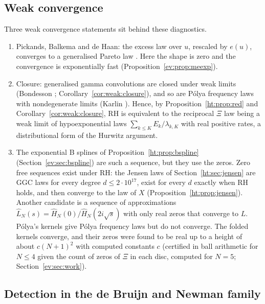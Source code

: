 \subsection{Weak convergence}\label{ev:sec:weak}

Three weak convergence statements sit behind these diagnostics.
\begin{enumerate}
\item Pickands, Balkema and de Haan: the excess law over $u$, rescaled by $e(u)$, converges to a generalised Pareto law \cite{Pickands75,BalkemaDeHaan74}. %
Here the shape is zero and the convergence is exponentially fast (Proposition~\ref{ev:prop:meexp}).
\item Closure: generalised gamma convolutions are closed under weak limits (Bondesson \cite{Bondesson}; Corollary~\ref{cor:weak:closure}), and so are P\'olya frequency laws with nondegenerate limits (Karlin \cite{Karlin68}). %
Hence, by Proposition~\ref{ht:prop:red} and Corollary~\ref{cor:weak:closure}, RH is equivalent to the reciprocal $\Xi$ law being a weak limit of hypoexponential laws $\sum_{k\le K}E_k/\lambda_{k,K}$ with real positive rates, a distributional form of the Hurwitz argument.
\item The exponential B splines of Proposition~\ref{ht:prop:bspline} (Section~\ref{ev:sec:bspline}) are such a sequence, but they use the zeros. Zero free sequences exist under RH: the Jensen laws of Section~\ref{ht:sec:jensen} are GGC laws for every degree $d\le2\cdot10^{17}$, exist for every $d$ exactly when RH holds, and then converge to the law of $X$ (Proposition~\ref{ht:prop:jensen}). Another candidate is a sequence of approximations $\widehat L_N(s)=\widehat H_N(0)/\widehat H_N(2i\sqrt s)$ with only real zeros that converge to $L$. P\'olya's kernels give P\'olya frequency laws but do not converge. The folded kernels converge, and their zeros were found to be real up to a height of about $c(N+1)^2$ with computed constants $c$ (certified in ball arithmetic for $N\le4$ given the count of zeros of $\Xi$ in each disc, computed for $N=5$; Section~\ref{ev:sec:work}).
\end{enumerate}

\subsection{Detection in the de Bruijn and Newman family}\label{ev:sec:detect}

